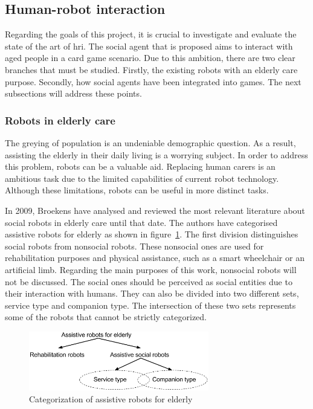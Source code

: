 \subsection{Human-robot interaction}

Regarding the goals of this project, it is crucial to investigate and evaluate the state of the art of \gls{hri}.
The social agent that is proposed aims to interact with aged people in a card game scenario.
Due to this ambition, there are two clear branches that must be studied.
Firstly, the existing robots with an elderly care purpose.
Secondly, how social agents have been integrated into games.
The next subsections will address these points.



\subsubsection{Robots in elderly care}


The greying of population is an undeniable demographic question.
As a result, assisting the elderly in their daily living is a worrying subject.
In order to address this problem, robots can be a valuable aid.
Replacing human carers is an ambitious task due to the limited capabilities of current robot technology.
Although these limitations, robots can be useful in more distinct tasks.

In 2009, Broekens have analysed and reviewed the most relevant literature about social robots in elderly care until that date.
The authors have categorised assistive robots for elderly as shown in figure~\ref{fig:categorization}.
The first division distinguishes social robots from nonsocial robots.
These nonsocial ones are used for rehabilitation purposes and physical assistance, such as a smart wheelchair or an artificial limb.
Regarding the main purposes of this work, nonsocial robots will not be discussed.
The social ones should be perceived as social entities due to their interaction with humans.
They can also be divided into two different sets, service type and companion type.
The intersection of these two sets represents some of the robots that cannot be strictly categorized.

\begin{figure}[h!]
  \centering
    \includegraphics[width=0.7\textwidth]{./img/categorization_robots}
  \caption{Categorization of assistive robots for elderly}
\label{fig:categorization}
\end{figure}

